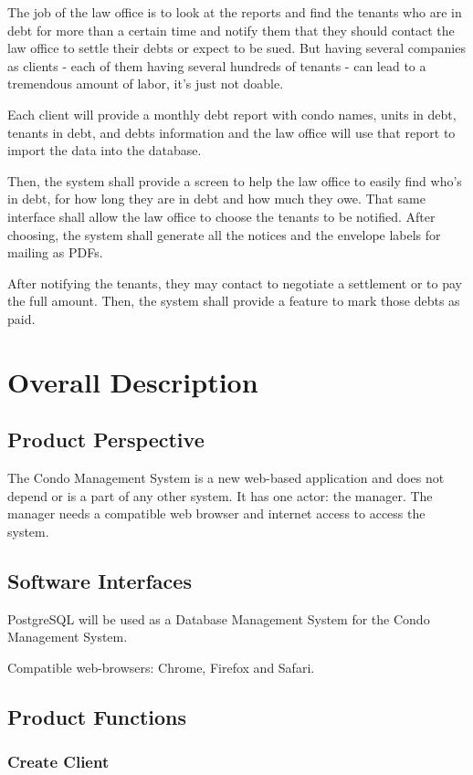 \documentclass{scrreprt}
\begin{document}
The job of the law office is to look at the reports and find the tenants who are in debt for more than a certain time and notify them that they should contact the law office to settle their debts or expect to be sued. But having several companies as clients - each of them having several hundreds of tenants - can lead to a tremendous amount of labor, it’s just not doable.

Each client will provide a monthly debt report with condo names, units in debt, tenants in debt, and debts information and the law office will use that report to import the data into the database.

Then, the system shall provide a screen to help the law office to easily find who’s in debt, for how long they are in debt and how much they owe. That same interface shall allow the law office to choose the tenants to be notified. After choosing, the system shall generate all the notices and the envelope labels for mailing as PDFs.

After notifying the tenants, they may contact to negotiate a settlement or to pay the full amount. Then, the system shall provide a feature to mark those debts as paid.

\chapter{Overall Description}

\section{Product Perspective}
The Condo Management System is a new web-based application and does not depend or is a part of any other system. It has one actor: the manager. The manager needs a compatible web browser and internet access to access the system.

\section{Software Interfaces}
PostgreSQL will be used as a Database Management System for the Condo Management System.

Compatible web-browsers: Chrome, Firefox and Safari.

\section{Product Functions}

\subsection{Create Client}
\end{document}
